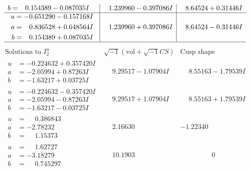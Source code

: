 \documentclass[1p]{elsarticle_modified}
\theoremstyle{definition}
\newcommand{\I}{\sqrt{-1}}
\begin{document}
$$\begin{array}{c|c|c}
\begin{aligned}
b &= \phantom{-}0.154389 - 0.087035 I\end{aligned}
 & \phantom{-}1.239960 - 0.397086 I & \phantom{-}8.64524 + 0.31446 I \\ \hline\begin{aligned}
u &= -0.651290 - 0.157168 I \\
a &= \phantom{-}0.836528 + 0.648564 I \\
b &= \phantom{-}0.154389 + 0.087035 I\end{aligned}
 & \phantom{-}1.239960 + 0.397086 I & \phantom{-}8.64524 - 0.31446 I\\
 \hline 
 \end{array}$$\newpage$$\begin{array}{c|c|c}  
\text{Solutions to }I^u_{2}& \I (\text{vol} + \sqrt{-1}CS) & \text{Cusp shape}\\
 \hline 
\begin{aligned}
u &= -0.224632 + 0.357420 I \\
a &= -2.05994 + 0.87263 I \\
b &= -1.63217 + 0.03725 I\end{aligned}
 & \phantom{-}9.29517 - 1.07904 I & \phantom{-}8.55163 - 1.79539 I \\ \hline\begin{aligned}
u &= -0.224632 - 0.357420 I \\
a &= -2.05994 - 0.87263 I \\
b &= -1.63217 - 0.03725 I\end{aligned}
 & \phantom{-}9.29517 + 1.07904 I & \phantom{-}8.55163 + 1.79539 I \\ \hline\begin{aligned}
u &= \phantom{-}0.386843\phantom{ +0.000000I} \\
a &= -2.78232\phantom{ +0.000000I} \\
b &= \phantom{-}1.15373\phantom{ +0.000000I}\end{aligned}
 & \phantom{-}2.16630\phantom{ +0.000000I} & -1.22340\phantom{ +0.000000I} \\ \hline\begin{aligned}
u &= \phantom{-}1.62727\phantom{ +0.000000I} \\
a &= -3.18279\phantom{ +0.000000I} \\
b &= \phantom{-}0.745297\phantom{ +0.000000I}\end{aligned}
 & \phantom{-}10.1903\phantom{ +0.000000I} & \phantom{-0.000000 } 0 \\ \hline\begin{aligned}

\end{aligned}
\end{array}$$
\end{document}
